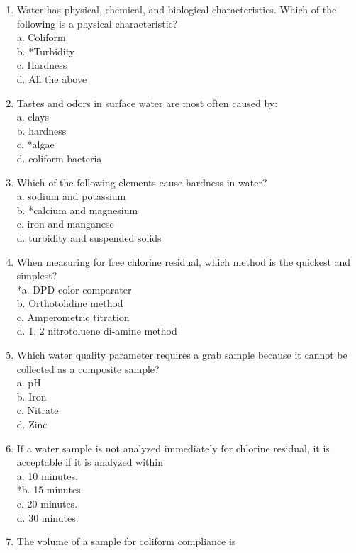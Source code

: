 \begin{enumerate}[1.]
\item Water has physical, chemical, and biological characteristics. Which of the following is a physical characteristic?\\
a. Coliform\\
b. *Turbidity\\
c. Hardness\\
d. All the above\\
\item Tastes and odors in surface water are most often caused by:\\
a. clays\\
b. hardness\\
c. *algae\\
d. coliform bacteria\\
\item Which of the following elements cause hardness in water?\\
a. sodium and potassium\\
b. *calcium and magnesium\\
c. iron and manganese\\
d. turbidity and suspended solids\\
\item When measuring for free chlorine residual, which method is the quickest and simplest?\\
*a. DPD color comparater\\
b. Orthotolidine method\\
c. Amperometric titration\\
d. 1, 2 nitrotoluene di-amine method\\
\item Which water quality parameter requires a grab sample because it cannot be collected as a composite sample?\\
a. $\mathrm{pH}$\\
b. Iron\\
c. Nitrate\\
d. Zinc\\
\item If a water sample is not analyzed immediately for chlorine residual, it is acceptable if it is analyzed within\\
a. 10 minutes.\\
*b. 15 minutes.\\
c. 20 minutes.\\
d. 30 minutes.\\
\item The volume of a sample for coliform compliance is\\

\end{enumerate}
